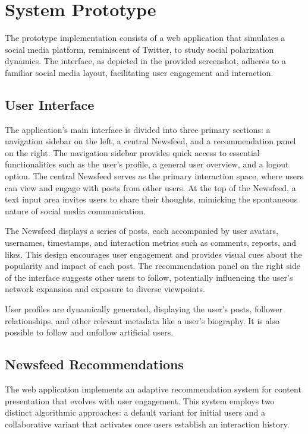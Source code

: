 \section{System Prototype}

The prototype implementation consists of a web application that simulates a social media platform, reminiscent of Twitter, to study social polarization dynamics. The interface, as depicted in the provided screenshot, adheres to a familiar social media layout, facilitating user engagement and interaction.

\subsection{User Interface}

The application's main interface is divided into three primary sections: a navigation sidebar on the left, a central Newsfeed, and a recommendation panel on the right. The navigation sidebar provides quick access to essential functionalities such as the user's profile, a general user overview, and a logout option. The central Newsfeed serves as the primary interaction space, where users can view and engage with posts from other users. At the top of the Newsfeed, a text input area invites users to share their thoughts, mimicking the spontaneous nature of social media communication.

The Newsfeed displays a series of posts, each accompanied by user avatars, usernames, timestamps, and interaction metrics such as comments, reposts, and likes. This design encourages user engagement and provides visual cues about the popularity and impact of each post. The recommendation panel on the right side of the interface suggests other users to follow, potentially influencing the user's network expansion and exposure to diverse viewpoints.

User profiles are dynamically generated, displaying the user's posts, follower relationships, and other relevant metadata like a user's biography. It is also possible to follow and unfollow artificial users.

\subsection{Newsfeed Recommendations}

The web application implements an adaptive recommendation system for content presentation that evolves with user engagement. This system employs two distinct algorithmic approaches: a default variant for initial users and a collaborative variant that activates once users establish an interaction history.

